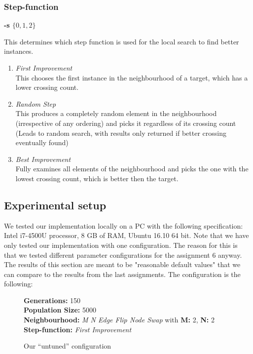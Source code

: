 \documentclass [11pt]{article}
\begin{document}
\subsubsection{Step-function} \textbf{-s $\{ 0,1,2\} $}

This determines which step function is used for the local search to find better instances. 

\begin{enumerate}\addtocounter{enumi}{-1}
  \item \emph{First Improvement }\\ 
  This chooses the first instance in the neighbourhood of a target, which has a lower crossing count. 
  \item\emph{ Random Step }\\ 
  This produces a completely random element in the neighbourhood (irrespective of any ordering) and picks it regardless of its crossing count (Leads to random search, with results only returned if better crossing eventually found)
  \item \emph{Best Improvement }\\
  Fully examines all elements of the neighbourhood and picks the one with the lowest crossing count, which is better then the target. 
\end{enumerate}


\subsection{Experimental setup}


We tested our implementation locally on a PC with the following specification: Intel i7-4500U processor, 8 GB of RAM, Ubuntu 16.10 64 bit. Note that we have only tested our implementation with one configuration. The reason for this is that we tested different parameter configurations for the assignment 6 anyway. The results of this section are meant to be "reasonable default values" that we can compare to the results from the last assignments.
The configuration is the following:


\begin{figure}[H]
  \textbf{Generations:} 150 \\
\textbf{Population Size:} 5000 \\
\textbf{Neighbourhood:} \emph{M N Edge Flip Node Swap} with \textbf{M:} 2, \textbf{N:} 2\\
\textbf{Step-function:} \emph{First Improvement} 
\caption{Our ``untuned'' configuration}
\end{figure}
\end{document}
